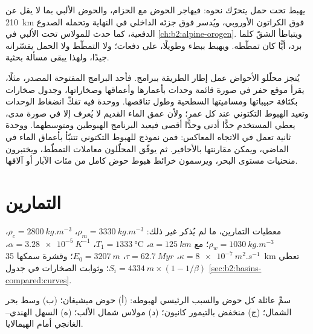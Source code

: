 يهبط  تحت حمل يتحرّك نحوه: فيهاجر الحوض مع الحزام،
والحوض الألبي بما لا يقل عن \qty{210}{km} فوق الكراتون الأوروبي، ويُدسر فوق جزئه الداخلي
في النهاية وتحمله الصدوع الدفعية، كما حدث للمولاس تحت الألبي في
\cref{ch:b2:alpine-orogen}. ويتباطأ الشقّ كلما برد، أيًّا كان
تمطّطه. ويهبط  ببطء وطويلًا، على دفعات؛ ولا التمطّط
ولا الحمل يفسّرانه جيدًا، ولهذا يبقى مسألة بحثية.

\begin{inthelab}
يُنجز محلّلو الأحواض عمل إطار الطريقة ببرامج. فأحد البرامج المفتوحة المصدر،
مثلًا، يقرأ موقع حفر في صورة قائمة وحدات بأعمارها وأعماقها وصخاراتها،
وجدول صخارات بكثافة حبيباتها ومساميتها السطحية وطول تناقصها. ووحدة
 فيه تفكّ انضغاط الوحدات وتعيد الهبوط التكتوني عند كل عمر؛
ولأن عمق الماء القديم لا يُعرف إلا في صورة مدى، يعطي المستخدم حدًّا أدنى وحدًّا أقصى
فيعيد البرنامج الهبوطين ومتوسطهما. ووحدة ثانية تعمل في الاتجاه المعاكس:
فمن نموذج للهبوط التكتوني تتنبّأ بأعماق الماء في الماضي، ويمكن
مقارنتها بالأحافير. ثم يوفّق المحلّلون معاملات التمطّط، ويختبرون منحنيات مستوى البحر،
ويرسمون خرائط هبوط حوض كامل من مئات الآبار أو آلافها.
\end{inthelab}

\section*{التمارين}\label{sec:b2:basins-compared:exercises}

معطيات التمارين، ما لم يُذكر غير ذلك: $\rho_m = \qty{3330}{kg.m^{-3}}$، $\rho_c =
\qty{2800}{kg.m^{-3}}$، $\rho_w = \qty{1030}{kg.m^{-3}}$؛  مع $a =
\qty{125}{km}$، $T_1 = \qty{1333}{\celsius}$، $\alpha = \qty{3.28e-5}{K^{-1}}$، $\kappa =
\qty{8e-7}{m^2.s^{-1}}$، $\tau = \qty{62.7}{Myr}$، $E_0 = \qty{3207}{m}$؛ وقشرة سمكها \qty{35}{km}
تعطي $S_i = \qty{4334}{m}\times(1 - 1/\beta)$؛ وثوابت الصخارات في جدول
\cref{sec:b2:basins-compared:curves}.

\begin{exercise}[$\star$]\label{exo:b2:basins-compared:1}
سمِّ عائلة كل حوض والسبب الرئيسي لهبوطه: (أ) حوض ميشيغان؛
(ب) وسط بحر الشمال؛ (ج) منخفض بالتيمور كانيون؛ (د) مولاس شمال الألب؛
(ه) السهل الهندي--الغانجي أمام الهيمالايا.
\end{exercise}

